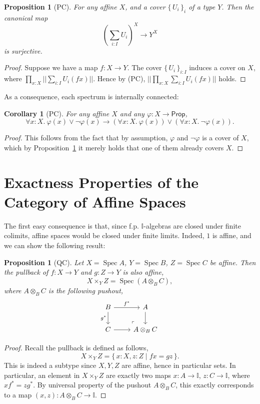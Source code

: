 \documentclass[12pt]{amsart}
\newtheorem{corollary}[theorem]{Corollary}
\newtheorem{proposition}[theorem]{Proposition}
\theoremstyle{definition}
\newcommand{\mbb}[1]{\mathbb{#1}}
\newcommand{\I}{\mbb I}
\newcommand{\ms}[1]{\mathsf{#1}}
\newcommand{\set}[1]{\{\,#1\,\}}
\newcommand{\scomp}[2]{\{\,#1\mid#2\,\}}
\newcommand{\prth}[1]{\left(#1\right)}
\newcommand{\fa}[2]{\forall #1\!\colon\!\!#2.\ }
\newcommand{\pss}[1]{||#1||} %
\newcommand{\pp}{\ms{Prop}}
\newcommand{\spec}{\operatorname{Spec}}
\begin{document}
\begin{proposition}[PC]\label{prop:supercompactspec}
  For any affine $X$, and a cover $\set{U_i}_{i}$ of a type $Y$. Then the canonical map
  \[ \prth{\sum_{i:I}U_i}^{X} \to Y^X \]
  is surjective.
\end{proposition}
\begin{proof}
  Suppose we have a map $f : X \to Y$. The cover $\set{U_i}_{i:I}$ induces a cover on $X$, where $\prod_{x:X}\pss{\sum_{i:I}U_i(fx)}$. Hence by (PC), $\pss{\prod_{x:X}\sum_{i:I}U_i(fx)}$ holds.
\end{proof}

As a consequence, each spectrum is internally connected:

\begin{corollary}[PC]\label{cor:internalconnectedspec}
  For any affine $X$ and any $\varphi : X \to \pp$,
  \[ \fa x{X} \varphi(x) \vee \neg\varphi(x) \to (\fa x{X}\varphi(x)) \vee (\fa x{X}\neg\varphi(x)). \]
\end{corollary}
\begin{proof}
  This follows from the fact that by assumption, $\varphi$ and $\neg\varphi$ is a cover of $X$, which by Proposition~\ref{prop:supercompactspec} it merely holds that one of them already covers $X$.
\end{proof}

\section{Exactness Properties of the Category of Affine Spaces}\label{sec:exactness_properties_of_the_category_of_affine_spaces}

The first easy consequence is that, since f.p. $\I$-algebras are closed under finite colimits, affine spaces would be closed under finite limits. Indeed, $1$ is affine, and we can show the following result:

\begin{proposition}[QC]\label{prop:pullbackofaffine}
  Let $X = \spec A$, $Y= \spec B$, $Z = \spec C$ be affine. Then the pullback of $f : X \to Y$ and $g : Z \to Y$ is also affine,
  \[ X \times_Y Z = \spec (A \otimes_B C), \]
  where $A \otimes_B C$ is the following pushout,
  \[
    \begin{tikzcd}
      B \ar[r, "f^*"] \ar[d, "g^*"'] & A \ar[d] \\
      C \ar[r] & A \otimes_B C
      \arrow["\lrcorner"{anchor=center, pos=0.125, rotate=180}, draw=none, from=2-2, to=1-1]
    \end{tikzcd}
  \]
\end{proposition}
\begin{proof}
  Recall the pullback is defined as follows,
  \[ X \times_Y Z = \scomp{x:X,z:Z}{fx = gz}. \]
  This is indeed a subtype since $X,Y,Z$ are affine, hence in particular sets. In particular, an element in $X \times_Y Z$ are exactly two maps $x : A \to \I$, $z : C \to \I$, where $xf^* = zg^*$. By universal property of the pushout $A \otimes_B C$, this exactly corresponds to a map $(x,z) : A \otimes_B C \to \I$.
\end{proof}
\end{document}
